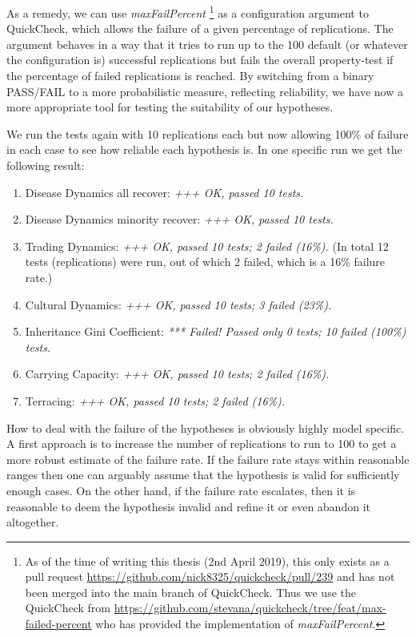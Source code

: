 As a remedy, we can use \textit{maxFailPercent} \footnote{As of the time of writing this thesis (2nd April 2019), this only exists as a pull request \url{https://github.com/nick8325/quickcheck/pull/239} and has not been merged into the main branch of QuickCheck. Thus we use the QuickCheck from \url{https://github.com/stevana/quickcheck/tree/feat/max-failed-percent} who has provided the implementation of \textit{maxFailPercent}.} as a configuration argument to QuickCheck, which allows the failure of a given percentage of replications. The argument behaves in a way that it tries to run up to the 100 default (or whatever the configuration is) successful replications but fails the overall property-test if the percentage of failed replications is reached. By switching from a binary PASS/FAIL to a more probabilistic measure, reflecting reliability, we have now a more appropriate tool for testing the suitability of our hypotheses. 

We run the tests again with 10 replications each but now allowing 100\% of failure in each case to see how reliable each hypothesis is. In one specific run we get the following result:


\begin{enumerate}
	\item Disease Dynamics all recover: \textit{+++ OK, passed 10 tests.}

	\item Disease Dynamics minority recover: \textit{+++ OK, passed 10 tests.}
		
	\item Trading Dynamics: \textit{+++ OK, passed 10 tests; 2 failed (16\%).} (In total 12 tests (replications) were run, out of which 2 failed, which is a 16\% failure rate.)
	
	\item Cultural Dynamics: \textit{+++ OK, passed 10 tests; 3 failed (23\%).}

	\item Inheritance Gini Coefficient: \textit{*** Failed! Passed only 0 tests; 10 failed (100\%) tests.}

	\item Carrying Capacity: \textit{+++ OK, passed 10 tests; 2 failed (16\%).}

	\item Terracing: \textit{+++ OK, passed 10 tests; 2 failed (16\%).}
\end{enumerate}

How to deal with the failure of the hypotheses is obviously highly model specific. A first approach is to increase the number of replications to run to 100 to get a more robust estimate of the failure rate. If the failure rate stays within reasonable ranges then one can arguably assume that the hypothesis is valid for sufficiently enough cases. On the other hand, if the failure rate escalates, then it is reasonable to deem the hypothesis invalid and refine it or even abandon it altogether.

